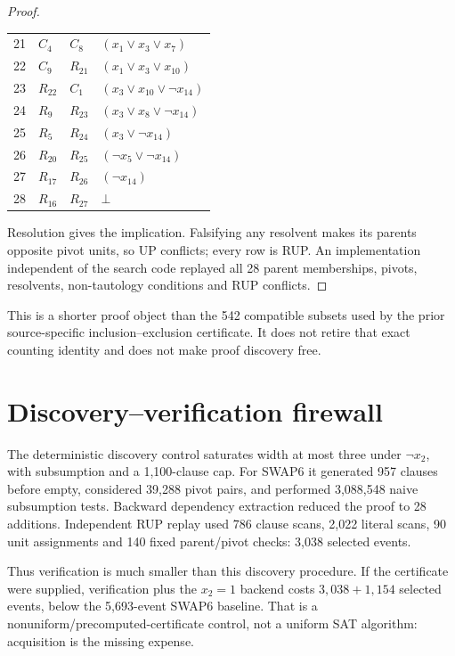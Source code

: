 \documentclass[10pt]{article}
\begin{document}
\begin{proof}
\begin{center}
\begin{longtable}{rlll}
21&$C_4$&$C_8$&$(x_1\vee x_3\vee x_7)$\\
22&$C_9$&$R_{21}$&$(x_1\vee x_3\vee x_{10})$\\
23&$R_{22}$&$C_1$&$(x_3\vee x_{10}\vee\neg x_{14})$\\
24&$R_9$&$R_{23}$&$(x_3\vee x_8\vee\neg x_{14})$\\
25&$R_5$&$R_{24}$&$(x_3\vee\neg x_{14})$\\
26&$R_{20}$&$R_{25}$&$(\neg x_5\vee\neg x_{14})$\\
27&$R_{17}$&$R_{26}$&$(\neg x_{14})$\\
28&$R_{16}$&$R_{27}$&$\bot$\\\bottomrule
\end{longtable}
\end{center}
Resolution gives the implication. Falsifying any resolvent makes its parents opposite pivot units, so UP conflicts; every row is RUP. An implementation independent of the search code replayed all 28 parent memberships, pivots, resolvents, non-tautology conditions and RUP conflicts.
\end{proof}

This is a shorter proof object than the 542 compatible subsets used by the prior source-specific inclusion--exclusion certificate. It does not retire that exact counting identity and does not make proof discovery free.

\section{Discovery--verification firewall}
The deterministic discovery control saturates width at most three under $\neg x_2$, with subsumption and a 1,100-clause cap. For SWAP6 it generated 957 clauses before empty, considered 39,288 pivot pairs, and performed 3,088,548 naive subsumption tests. Backward dependency extraction reduced the proof to 28 additions. Independent RUP replay used 786 clause scans, 2,022 literal scans, 90 unit assignments and 140 fixed parent/pivot checks: 3,038 selected events.

Thus verification is much smaller than this discovery procedure. If the certificate were supplied, verification plus the $x_2=1$ backend costs $3,038+1,154$ selected events, below the 5,693-event SWAP6 baseline. That is a nonuniform/precomputed-certificate control, not a uniform SAT algorithm: acquisition is the missing expense.
\end{document}
